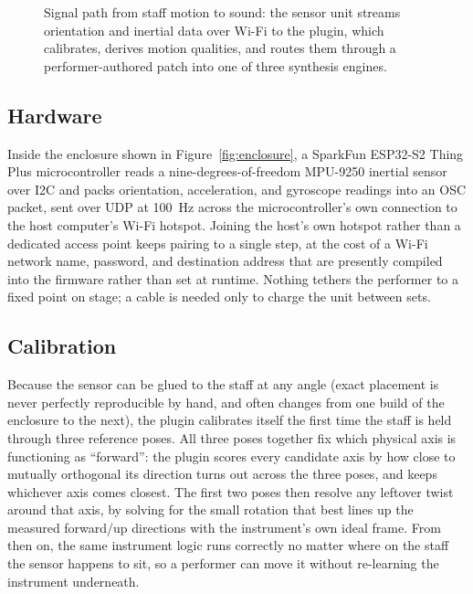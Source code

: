 \documentclass[a4paper,10pt,oneside]{article}
\begin{document}
\begin{sloppy}
\begin{figure}[H]
{%
}
\caption{Signal path from staff motion to sound: the sensor unit streams orientation
  and inertial data over Wi-Fi to the plugin, which calibrates, derives motion
  qualities, and routes them through a performer-authored patch into one of three
  synthesis engines.}
\label{fig:architecture}
\end{figure}
\FloatBarrier

\subsection{Hardware}
\label{ssec:hardware}

Inside the enclosure shown in Figure~\ref{fig:enclosure}, a SparkFun ESP32-S2 Thing Plus
microcontroller reads a nine-degrees-of-freedom MPU-9250 inertial sensor over I2C and
packs orientation, acceleration, and gyroscope readings into an OSC packet, sent over
UDP at 100~Hz across the microcontroller's own connection to the host computer's Wi-Fi
hotspot. Joining the host's own hotspot rather than a dedicated access point keeps
pairing to a single step, at the cost of a Wi-Fi network name, password, and destination
address that are presently compiled into the firmware rather than set at runtime. Nothing
tethers the performer to a fixed point on stage; a cable is needed only to charge the
unit between sets.

\subsection{Calibration}
\label{ssec:calibration}

Because the sensor can be glued to the staff at any angle (exact placement is never
perfectly reproducible by hand, and often changes from one build of the enclosure to
the next), the plugin calibrates itself the first time the staff is held through three
reference poses. All three poses together fix which physical axis is functioning as
``forward'': the plugin scores every candidate axis by how close to mutually orthogonal
its direction turns out across the three poses, and keeps whichever axis comes closest.
The first two poses then resolve any leftover twist around that axis, by solving for the
small rotation that best lines up the measured forward/up directions with the
instrument's own ideal frame. From then on, the same instrument logic runs correctly no
matter where on the staff the sensor happens to sit, so a performer can move it without
re-learning the instrument underneath.


\end{sloppy}
\end{document}
